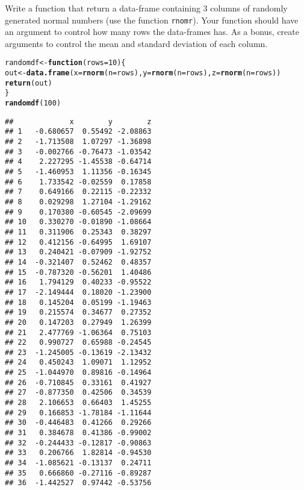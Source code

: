 \documentclass[12pt,a4paper]{scrartcl}\usepackage[]{graphicx}\usepackage[]{color}
\makeatletter
\newcommand{\hlnum}[1]{\textcolor[rgb]{0.686,0.059,0.569}{#1}}%
\newcommand{\hlstd}[1]{\textcolor[rgb]{0.345,0.345,0.345}{#1}}%
\newcommand{\hlkwa}[1]{\textcolor[rgb]{0.161,0.373,0.58}{\textbf{#1}}}%
\newcommand{\hlkwb}[1]{\textcolor[rgb]{0.69,0.353,0.396}{#1}}%
\newcommand{\hlkwc}[1]{\textcolor[rgb]{0.333,0.667,0.333}{#1}}%
\newcommand{\hlkwd}[1]{\textcolor[rgb]{0.737,0.353,0.396}{\textbf{#1}}}%
\newenvironment{kframe}{%
 \def\at@end@of@kframe{}%
 \ifinner\ifhmode%
  \def\at@end@of@kframe{\end{minipage}}%
  \begin{minipage}{\columnwidth}%
 \fi\fi%
 \def\FrameCommand##1{\hskip\@totalleftmargin \hskip-\fboxsep
 \colorbox{shadecolor}{##1}\hskip-\fboxsep
     \hskip-\linewidth \hskip-\@totalleftmargin \hskip\columnwidth}%
 \MakeFramed {\advance\hsize-\width
   \@totalleftmargin\z@ \linewidth\hsize
   \@setminipage}}%
 {\par\unskip\endMakeFramed%
 \at@end@of@kframe}
\newenvironment{knitrout}{}{} %
\makeatother
\begin{document}
\begin{Exercise}[difficulty=2, title={Write a data-frame of random values in output}]
Write a function that return a data-frame containing 3 columns of randomly generated normal numbers (use the function \texttt{rnomr}). Your function should have an argument to control how many rows the data-frames has. As a bonus, create arguments to control the mean and standard deviation of each column.
\end{Exercise}
\begin{Answer}
\begin{knitrout}
\color{fgcolor}\begin{kframe}
\begin{alltt}
\hlstd{randomdf} \hlkwb{<-} \hlkwa{function}\hlstd{(}\hlkwc{rows}\hlstd{=}\hlnum{10}\hlstd{)\{}
  \hlstd{out} \hlkwb{<-} \hlkwd{data.frame}\hlstd{(}\hlkwc{x} \hlstd{=} \hlkwd{rnorm}\hlstd{(}\hlkwc{n}\hlstd{=rows),} \hlkwc{y}\hlstd{=} \hlkwd{rnorm}\hlstd{(}\hlkwc{n}\hlstd{=rows),} \hlkwc{z} \hlstd{=} \hlkwd{rnorm}\hlstd{(}\hlkwc{n}\hlstd{=rows))}
  \hlkwd{return}\hlstd{(out)}
\hlstd{\}}
\hlkwd{randomdf}\hlstd{(}\hlnum{100}\hlstd{)}
\end{alltt}
\begin{verbatim}
##             x        y        z
## 1   -0.680657  0.55492 -2.08863
## 2   -1.713508  1.07297 -1.36898
## 3   -0.002766 -0.76473 -1.03542
## 4    2.227295 -1.45538 -0.64714
## 5   -1.460953  1.11356 -0.16345
## 6    1.733542 -0.02559  0.17858
## 7    0.649166  0.22115 -0.22332
## 8    0.029298  1.27104 -1.29162
## 9    0.170380 -0.60545 -2.09699
## 10   0.330270 -0.01890 -1.08664
## 11   0.311906  0.25343  0.38297
## 12   0.412156 -0.64995  1.69107
## 13   0.240421 -0.07909 -1.92752
## 14  -0.321407  0.52462  0.48357
## 15  -0.787320 -0.56201  1.40486
## 16   1.794129  0.40233 -0.95522
## 17  -2.149444  0.18020 -1.23900
## 18   0.145204  0.05199 -1.19463
## 19   0.215574  0.34677  0.27352
## 20   0.147203  0.27949  1.26399
## 21   2.477769 -1.06364  0.75103
## 22   0.990727  0.65988 -0.24545
## 23  -1.245005 -0.13619 -2.13432
## 24   0.450243  1.09071  1.12952
## 25  -1.044970  0.89816 -0.14964
## 26  -0.710845  0.33161  0.41927
## 27  -0.877350  0.42506  0.34539
## 28   2.106653  0.66403  1.45255
## 29   0.166853 -1.78184 -1.11644
## 30  -0.446483  0.41266  0.29266
## 31   0.384678  0.41386 -0.99002
## 32  -0.244433 -0.12817 -0.90863
## 33   0.206766  1.82814 -0.94530
## 34  -1.085621 -0.13137  0.24711
## 35   0.666860 -0.27116 -0.89287
## 36  -1.442527  0.97442 -0.53756

\end{verbatim}
\end{kframe}
\end{knitrout}
\end{Answer}
\end{document}
